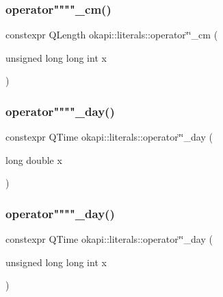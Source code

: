 \mbox{\label{namespaceokapi_1_1literals_aee248e89ed1fd0ae224a80eaac04be72}} 
\subsubsection{\texorpdfstring{operator""""\_cm()}{operator""\_cm()}\hspace{0.1cm}{\footnotesize\ttfamily [2/2]}}
{\footnotesize\ttfamily constexpr Q\+Length okapi\+::literals\+::operator\char`\"{}\char`\"{}\+\_\+cm (\begin{DoxyParamCaption}\item[{unsigned long long int}]{x }\end{DoxyParamCaption})}

\mbox{\label{namespaceokapi_1_1literals_a399e9f29b15b5e34ea3577f011a3ca28}} 
\subsubsection{\texorpdfstring{operator""""\_day()}{operator""\_day()}\hspace{0.1cm}{\footnotesize\ttfamily [1/2]}}
{\footnotesize\ttfamily constexpr Q\+Time okapi\+::literals\+::operator\char`\"{}\char`\"{}\+\_\+day (\begin{DoxyParamCaption}\item[{long double}]{x }\end{DoxyParamCaption})}

\mbox{\label{namespaceokapi_1_1literals_a323a83894d9b82367a9a5e4ed103bb42}} 
\subsubsection{\texorpdfstring{operator""""\_day()}{operator""\_day()}\hspace{0.1cm}{\footnotesize\ttfamily [2/2]}}
{\footnotesize\ttfamily constexpr Q\+Time okapi\+::literals\+::operator\char`\"{}\char`\"{}\+\_\+day (\begin{DoxyParamCaption}\item[{unsigned long long int}]{x }\end{DoxyParamCaption})}


